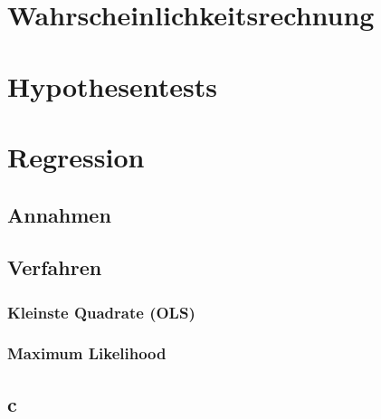 \documentclass[10pt]{article}
\begin{document}



\section{Wahrscheinlichkeitsrechnung}





\section{Hypothesentests}




\section{Regression}

\subsection{Annahmen}

\subsection{Verfahren}
\subsubsection{Kleinste Quadrate (OLS)}
\subsubsection{Maximum Likelihood}

\subsection{c}
\end{document}

